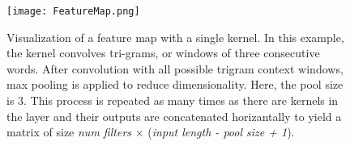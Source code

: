 \begin{figure}[H]
\centering
\texttt{[image: FeatureMap.png]}
\caption{Visualization of a feature map with a single kernel. In this example, the kernel convolves tri-grams, or windows of three consecutive words.
After convolution with all possible trigram context windows, max pooling is applied to reduce dimensionality.
Here, the pool size is 3. This process is repeated as many times as there are kernels in the layer and their outputs are
concatenated horizantally to yield a matrix of size \textit{num filters} $\times$ (\textit{input length - pool size + 1}).}
\label{fig:convolution}
\end{figure}
